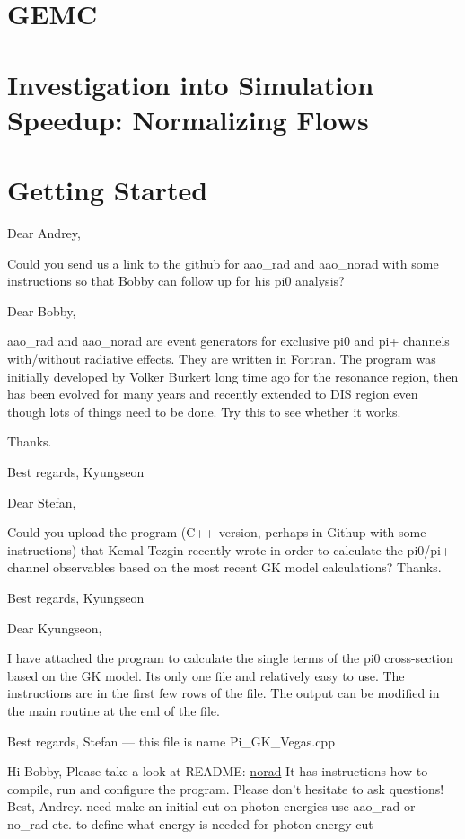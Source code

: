     \section{GEMC}

\section{Investigation into Simulation Speedup: Normalizing Flows}


\section{Getting Started}
    Dear Andrey,
    
    Could you send us a link to the github for aao\_rad and aao\_norad with some instructions so that Bobby can follow up for his pi0 analysis?  
    
    Dear Bobby,
    
    aao\_rad and aao\_norad are event generators for exclusive pi0 and pi+ channels with/without radiative effects.  They are written in Fortran.  The program was initially developed by Volker Burkert long time ago for the resonance region, then has been evolved for many years and recently extended to DIS region even though lots of things need to be done.  Try this to see whether it works.  
    
    Thanks.
    
    Best regards, Kyungseon
    
    
    Dear Stefan,
    
    Could you upload the program (C++ version, perhaps in Githup with some instructions) that Kemal Tezgin recently wrote in order to calculate the pi0/pi+ channel observables based on the most recent GK model calculations?  Thanks.
    
    Best regards, Kyungseon
    
    
    Dear Kyungseon,
    
    I have attached the program to calculate the single terms of the pi0 
    cross-section based on the GK model.
    Its only one file and relatively easy to use. The instructions are in 
    the first few rows of the file.
    The output can be modified in the main routine at the end of the file.
    
    Best regards,
    Stefan --- this file is name Pi\_GK\_Vegas.cpp
    
    
    Hi Bobby,
    Please take a look at README:
    \href{https://github.com/drewkenjo/aao\_norad}{norad}
    It has instructions how to compile, run and configure the program.
    Please don't hesitate to ask questions!
    Best,
    Andrey.
    need make an initial cut on photon energies
use aao\_rad or no\_rad etc. to define what energy is needed for photon energy cut

